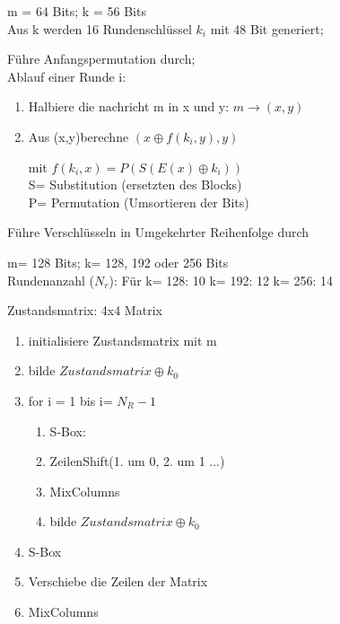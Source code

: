 \begin{multicols}{2}
m = 64 Bits; 	k = 56 Bits\\
Aus k werden 16 Rundenschlüssel $k_i$ mit 48 Bit generiert;

Führe Anfangspermutation durch;\\
Ablauf einer Runde i:
\begin{enumerate}
\item Halbiere die nachricht m in x und y: $m \to (x,y)$
\item  Aus (x,y)berechne $(x \oplus f(k_i,y),y)$

 mit $f(k_i,x) = P(S(E(x)\oplus k_i))$\\
	S= Substitution (ersetzten des Blocks)\\
	P= Permutation (Umsortieren der Bits)
\end{enumerate}

Führe Verschlüsseln in Umgekehrter Reihenfolge durch

m= 128 Bits;	k= 128, 192 oder 256 Bits		\\
Rundenanzahl ($N_r$): Für k= 128: 10 k= 192: 12 k= 256: 14

Zustandsmatrix:  4x4 Matrix

\begin{enumerate}
\item initialisiere Zustandsmatrix mit m
\item bilde $Zustandsmatrix \oplus k_0$
\item for i = 1 bis i= $N_R-1$
\begin{enumerate}
\item 	S-Box:
\item	ZeilenShift(1. um 0, 2. um 1 ...)
\item 	MixColumns
\item 	bilde $Zustandsmatrix \oplus k_0$
\end{enumerate}
\item S-Box
\item Verschiebe die Zeilen der Matrix
\item MixColumns
\end{enumerate}\end{multicols}%
%
